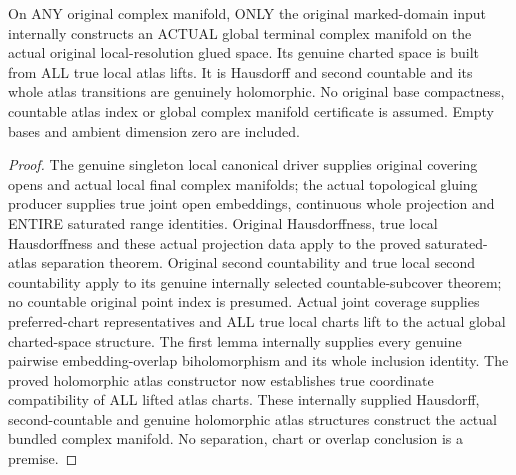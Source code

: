 \begin{theorem}
\label{hir:original-input-global-terminal-genuine-complex-manifold}
\leanok
{}
On ANY original complex manifold, ONLY the original marked-domain input
internally constructs an ACTUAL global terminal complex manifold on the
actual original local-resolution glued space. Its genuine charted space
is built from ALL true local atlas lifts. It is Hausdorff and second
countable and its whole atlas transitions are genuinely holomorphic.
No original base compactness, countable atlas index or global complex
manifold certificate is assumed. Empty bases and ambient dimension zero
are included.
\end{theorem}
\begin{proof}
The genuine singleton local canonical driver supplies original covering
opens and actual local final complex manifolds; the actual topological
gluing producer supplies true joint open embeddings, continuous whole
projection and ENTIRE saturated range identities. Original Hausdorffness,
true local Hausdorffness and these actual projection data apply to the
proved saturated-atlas separation theorem. Original second countability
and true local second countability apply to its genuine internally selected
countable-subcover theorem; no countable original point index is presumed.
Actual joint coverage supplies preferred-chart representatives and ALL
true local charts lift to the actual global charted-space structure. The
first lemma internally supplies every genuine pairwise embedding-overlap
biholomorphism and its whole inclusion identity. The proved holomorphic
atlas constructor now establishes true coordinate compatibility of ALL
lifted atlas charts. These internally supplied Hausdorff, second-countable
and genuine holomorphic atlas structures construct the actual bundled
complex manifold. No separation, chart or overlap conclusion is a premise.
\end{proof}

